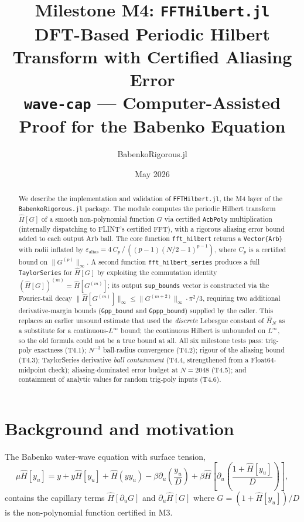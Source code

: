 \documentclass[11pt]{article}
\title{\textbf{Milestone M4: \texttt{FFTHilbert.jl}}\\[0.4em]
\large DFT-Based Periodic Hilbert Transform with Certified Aliasing Error\\[0.2em]
\normalsize \texttt{wave-cap} --- Computer-Assisted Proof for the Babenko Equation}
\author{BabenkoRigorous.jl}
\date{May 2026}
\theoremstyle{definition}
\begin{document}
\maketitle

\begin{abstract}
We describe the implementation and validation of \texttt{FFTHilbert.jl},
the M4 layer of the \texttt{BabenkoRigorous.jl} package.
The module computes the periodic Hilbert transform $\hat H[G]$ of a smooth
non-polynomial function $G$ via certified \texttt{AcbPoly} multiplication
(internally dispatching to FLINT's certified FFT), with a rigorous aliasing
error bound added to each output Arb ball.
The core function \texttt{fft\_hilbert} returns a \texttt{Vector\{Arb\}} with
radii inflated by
$\varepsilon_{\mathrm{alias}} = 4\,C_p\,/\,((p-1)(N/2-1)^{p-1})$,
where $C_p$ is a certified bound on $\|G^{(p)}\|_\infty$.
A second function \texttt{fft\_hilbert\_series} produces a full
\texttt{TaylorSeries} for $\hat H[G]$ by exploiting the commutation identity
$(\hat H[G])^{(m)} = \hat H[G^{(m)}]$; its output \texttt{sup\_bounds} vector
is constructed via the Fourier-tail decay $\|\hat H[G^{(m)}]\|_\infty \le
\|G^{(m+2)}\|_\infty \cdot \pi^2/3$, requiring two additional derivative-margin
bounds (\texttt{Gpp\_bound} and \texttt{Gppp\_bound}) supplied by the caller.
This replaces an earlier unsound estimate that used the \emph{discrete}
Lebesgue constant of $\hat H_N$ as a substitute for a continuous-$L^\infty$
bound; the continuous Hilbert is unbounded on $L^\infty$, so the old formula
could not be a true bound at all.
All six milestone tests pass:
trig-poly exactness (T4.1); $N^{-3}$ ball-radius convergence (T4.2);
rigour of the aliasing bound (T4.3); TaylorSeries derivative
\emph{ball containment} (T4.4, strengthened from a Float64-midpoint check);
aliasing-dominated error budget at $N=2048$ (T4.5); and
containment of analytic values for random trig-poly inputs (T4.6).
\end{abstract}

\tableofcontents
\bigskip

\section{Background and motivation}

The Babenko water-wave equation with surface tension,
\[
  \mu\hat H[y_u] = y + y\hat H[y_u] + \hat H(yy_u)
  - \beta\partial_u\!\left(\frac{y_u}{D}\right)
  + \beta\hat H\!\left[\partial_u\!\left(\frac{1+\hat H[y_u]}{D}\right)\right],
\]
contains the capillary terms $\hat H[\partial_u G]$ and $\partial_u \hat H[G]$
where $G = (1+\hat H[y_u])/D$ is the non-polynomial function certified in M3.
\end{document}
